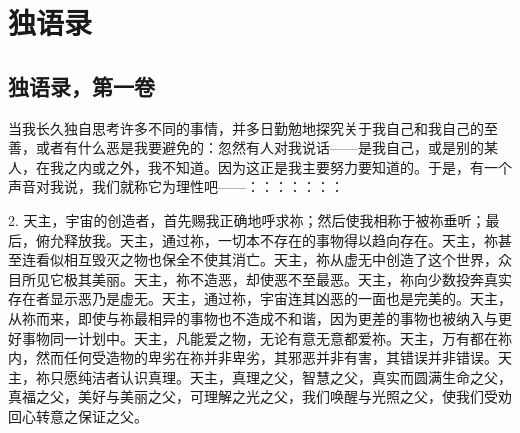 
\chapter{独语录}


\newline{}\par



\section{独语录，第一卷}

当我长久独自思考许多不同的事情，并多日勤勉地探究关于我自己和我自己的至善，或者有什么恶是我要避免的：忽然有人对我说话——是我自己，或是别的某人，在我之内或之外，我不知道。因为这正是我主要努力要知道的。于是，有一个声音对我说，我们就称它为理性吧——：：：：：：：\par

2. 天主，宇宙的创造者，首先赐我正确地呼求祢；然后使我相称于被祢垂听；最后，俯允释放我。天主，通过祢，一切本不存在的事物得以趋向存在。天主，祢甚至连看似相互毁灭之物也保全不使其消亡。天主，祢从虚无中创造了这个世界，众目所见它极其美丽。天主，祢不造恶，却使恶不至最恶。天主，祢向少数投奔真实存在者显示恶乃是虚无。天主，通过祢，宇宙连其凶恶的一面也是完美的。天主，从祢而来，即使与祢最相异的事物也不造成不和谐，因为更差的事物也被纳入与更好事物同一计划中。天主，凡能爱之物，无论有意无意都爱祢。天主，万有都在祢内，然而任何受造物的卑劣在祢并非卑劣，其邪恶并非有害，其错误并非错误。天主，祢只愿纯洁者认识真理。天主，真理之父，智慧之父，真实而圆满生命之父，真福之父，美好与美丽之父，可理解之光之父，我们唤醒与光照之父，使我们受劝回心转意之保证之父。\par

